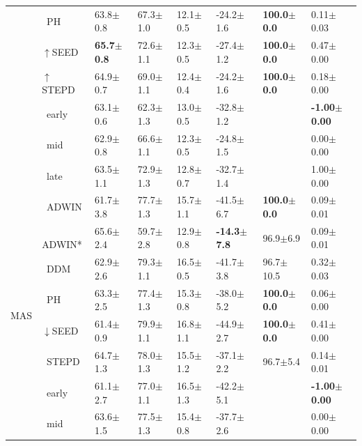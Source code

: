 \begin{tabular}{llllllll}
 & $\ \;$PH & 63.8\tiny{$\pm$0.8} & 67.3\tiny{$\pm$1.0} & 12.1\tiny{$\pm$0.5} & -24.2\tiny{$\pm$1.6} & \textbf{100.0\tiny{$\pm$0.0}} & 0.11\tiny{$\pm$0.03} \\
 & $\uparrow$SEED & \textbf{65.7\tiny{$\pm$0.8}} & 72.6\tiny{$\pm$1.1} & 12.3\tiny{$\pm$0.5} & -27.4\tiny{$\pm$1.2} & \textbf{100.0\tiny{$\pm$0.0}} & 0.47\tiny{$\pm$0.00} \\
 & $\uparrow$STEPD & 64.9\tiny{$\pm$0.7} & 69.0\tiny{$\pm$1.1} & 12.4\tiny{$\pm$0.4} & -24.2\tiny{$\pm$1.6} & \textbf{100.0\tiny{$\pm$0.0}} & 0.18\tiny{$\pm$0.00} \\
 & $\ \;$early & 63.1\tiny{$\pm$0.6} & 62.3\tiny{$\pm$1.3} & 13.0\tiny{$\pm$0.5} & -32.8\tiny{$\pm$1.2} &  & \textbf{-1.00\tiny{$\pm$0.00}} \\
 & $\ \;$mid & 62.9\tiny{$\pm$0.8} & 66.6\tiny{$\pm$1.1} & 12.3\tiny{$\pm$0.5} & -24.8\tiny{$\pm$1.5} &  & 0.00\tiny{$\pm$0.00} \\
 & $\ \;$late & 63.5\tiny{$\pm$1.1} & 72.9\tiny{$\pm$1.3} & 12.8\tiny{$\pm$0.7} & -32.7\tiny{$\pm$1.4} &  & 1.00\tiny{$\pm$0.00} \\
\midrule
\multirow[t]{9}{*}{MAS} & $\ \;$ADWIN & 61.7\tiny{$\pm$3.8} & 77.7\tiny{$\pm$1.3} & 15.7\tiny{$\pm$1.1} & -41.5\tiny{$\pm$6.7} & \textbf{100.0\tiny{$\pm$0.0}} & 0.09\tiny{$\pm$0.01} \\
 & $\ \;$ADWIN* & 65.6\tiny{$\pm$2.4} & 59.7\tiny{$\pm$2.8} & 12.9\tiny{$\pm$0.8} & \textbf{-14.3\tiny{$\pm$7.8}} & 96.9\tiny{$\pm$6.9} & 0.09\tiny{$\pm$0.01} \\
 & $\ \;$DDM & 62.9\tiny{$\pm$2.6} & 79.3\tiny{$\pm$1.1} & 16.5\tiny{$\pm$0.5} & -41.7\tiny{$\pm$3.8} & 96.7\tiny{$\pm$10.5} & 0.32\tiny{$\pm$0.03} \\
 & $\ \;$PH & 63.3\tiny{$\pm$2.5} & 77.4\tiny{$\pm$1.3} & 15.3\tiny{$\pm$0.8} & -38.0\tiny{$\pm$5.2} & \textbf{100.0\tiny{$\pm$0.0}} & 0.06\tiny{$\pm$0.00} \\
 & $\downarrow$SEED & 61.4\tiny{$\pm$0.9} & 79.9\tiny{$\pm$1.1} & 16.8\tiny{$\pm$1.1} & -44.9\tiny{$\pm$2.7} & \textbf{100.0\tiny{$\pm$0.0}} & 0.41\tiny{$\pm$0.00} \\
 & $\ \;$STEPD & 64.7\tiny{$\pm$1.3} & 78.0\tiny{$\pm$1.3} & 15.5\tiny{$\pm$1.2} & -37.1\tiny{$\pm$2.2} & 96.7\tiny{$\pm$5.4} & 0.14\tiny{$\pm$0.01} \\
 & $\ \;$early & 61.1\tiny{$\pm$2.7} & 77.0\tiny{$\pm$1.1} & 16.5\tiny{$\pm$1.3} & -42.2\tiny{$\pm$5.1} &  & \textbf{-1.00\tiny{$\pm$0.00}} \\
 & $\ \;$mid & 63.6\tiny{$\pm$1.5} & 77.5\tiny{$\pm$1.3} & 15.4\tiny{$\pm$0.8} & -37.7\tiny{$\pm$2.6} &  & 0.00\tiny{$\pm$0.00} \\

\end{tabular}

